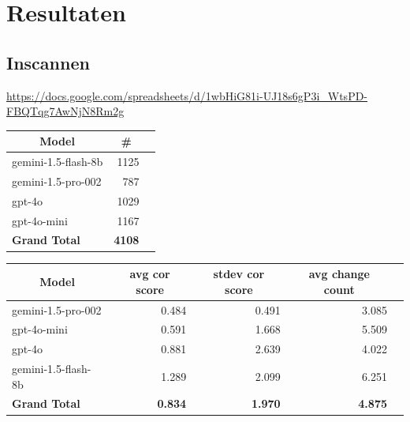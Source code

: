 \documentclass[12pt]{article}
\begin{document}
\section{Resultaten}
\subsection{Inscannen}


\url{https://docs.google.com/spreadsheets/d/1wbHiG81i-UJ18s6gP3i_WtsPD-FBQTqg7AwNjN8Rm2g}

\noindent\begin{table}[h]\begin{tabularx}{\textwidth}{X *2{r}}
    \toprule
    \multicolumn{1}{c}{\textbf{Model}} & \multicolumn{1}{c}{\textbf{\#}} \\  %
    \midrule
    gemini-1.5-flash-8b & 1125 \\
    gemini-1.5-pro-002 & 787 \\
    gpt-4o & 1029 \\
    gpt-4o-mini & 1167 \\
    \midrule
    \textbf{Grand Total} & \textbf{4108} \\
    \bottomrule
\end{tabularx}%
\end{table}

\noindent\begin{table}[h]\begin{tabularx}{\textwidth}{X *4{r}}
\toprule
\multicolumn{1}{c}{\textbf{Model}} & \multicolumn{1}{c}{\textbf{avg cor score}} & \multicolumn{1}{c}{\textbf{stdev cor score}} & \multicolumn{1}{c}{\textbf{avg change count}} \\
\midrule
gemini-1.5-pro-002 & 0.484 & 0.491 & 3.085 \\
gpt-4o-mini & 0.591 & 1.668 & 5.509 \\
gpt-4o & 0.881 & 2.639 & 4.022 \\
gemini-1.5-flash-8b & 1.289 & 2.099 & 6.251 \\
\midrule
\textbf{Grand Total} & \textbf{0.834} & \textbf{1.970} & \textbf{4.875} \\
\bottomrule
\end{tabularx}%
\end{table}
\end{document}
